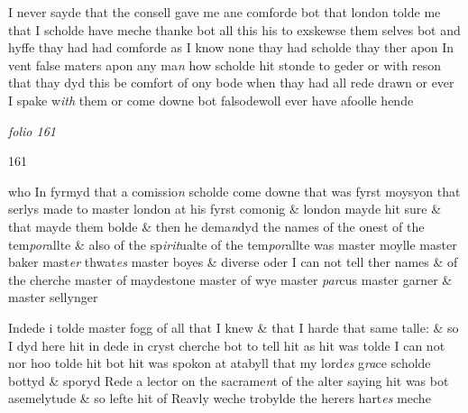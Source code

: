 \documentclass[12pt, a4paper]{book}
\begin{document}
		\ifthenelse{\isodd{\thepage}}
		{\reversemarginpar}
		{\normalmarginpar}
		I never sayde that the consell gave me ane comforde
 bot that london tolde me that I scholde have meche
 thanke bot
			 all this his to exskewse them selves bot and
			 hyffe
 thay had had comforde as I know none thay had scholde
 thay ther apon In vent false maters apon any ma\textit{n}
 how scholde hit stonde to geder or with reson 
			 that thay dyd this be
 comfort of ony bode when thay had all rede drawn
 or ever I spake w\textit{ith} them or come downe bot
			 falsodewoll ever
 have afoolle hende
            	

\dotfill
						\newpage
{}

\textit{folio 161}


\begin{flushright}{\color{Mahogany}161}\end{flushright}
 	
 		
			
 		
		\ifthenelse{\isodd{\thepage}}
		{\reversemarginpar}
		{\normalmarginpar}
		who In fyrmyd that a comissio\textit{n} scholde come downe that
 was fyrst moysyon that serlys made to master london
 			at his fyrst comonig \& london mayde hit sure \& that
 mayde them bolde \& then he dema\textit{n}dyd the names
 of the onest of the tem\textit{por}allte \& also of the sp\textit{irit}ualte
 			of the tem\textit{por}allte was master moylle master baker
 			mast\textit{er} thwat\textit{es} master boyes \& diverse oder I can
 not tell ther names \& of the cherche master of
 	maydestone master of wye master \textit{par}cus master
 		garner \& master sellynger

	
				\marginpar[\vspace{0.5cm}{\textcolor{Gray}{i0.}}]{}
			
	
		\ifthenelse{\isodd{\thepage}}
		{\reversemarginpar}
		{\normalmarginpar}
		Indede i tolde master fogg of all that I knew \& that I
 harde that same talle: \& so I dyd here hit in dede in
 cryst cherche bot to tell hit as hit was tolde I can not
 nor hoo tolde hit bot hit was spokon at atabyll
 that my lord\textit{es} g\textit{ra}ce scholde bottyd \& sporyd Rede a
 lector on the sacrame\textit{n}t of the alter saying
 hit was bot asemelytude \& so lefte hit of Reavly
 weche trobylde the herers hart\textit{es} meche
\end{document}
